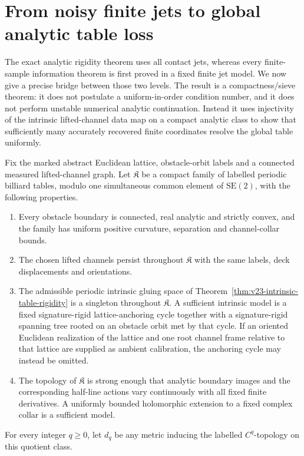 \section{From noisy finite jets to global analytic table loss}
\label{sec:v23-analytic-global-bridge}

The exact analytic rigidity theorem uses all contact jets, whereas every
finite-sample information theorem is first proved in a fixed finite jet model.
We now give a precise bridge between those two levels.  The result is a
compactness/sieve theorem: it does not postulate a uniform-in-order condition
number, and it does not perform unstable numerical analytic continuation.
Instead it uses injectivity of the intrinsic lifted-channel data map on a
compact analytic class to show that sufficiently many accurately recovered
finite coordinates resolve the global table uniformly.

Fix the marked abstract Euclidean lattice, obstacle-orbit labels and a
connected measured lifted-channel graph.  Let \(\mathfrak K\) be a compact
family of labelled periodic billiard tables, modulo one simultaneous common
element of \(\mathrm{SE}(2)\), with the following properties.
\begin{enumerate}
\item Every obstacle boundary is connected, real analytic and strictly convex,
and the family has uniform positive curvature, separation and channel-collar
bounds.
\item The chosen lifted channels persist throughout \(\mathfrak K\) with the
same labels, deck displacements and orientations.
\item The admissible periodic intrinsic gluing space of
Theorem~\ref{thm:v23-intrinsic-table-rigidity} is a singleton throughout
\(\mathfrak K\).  A sufficient intrinsic model is a fixed signature-rigid
lattice-anchoring cycle together with a signature-rigid spanning tree rooted
on an obstacle orbit met by that cycle.  If an oriented Euclidean realization
of the lattice and one root channel frame relative to that lattice are supplied
as ambient calibration, the anchoring cycle may instead be omitted.
\item The topology of \(\mathfrak K\) is strong enough that analytic boundary
images and the corresponding half-line actions vary continuously with all
fixed finite derivatives.  A uniformly bounded holomorphic extension to a
fixed complex collar is a sufficient model.
\end{enumerate}
For every integer \(q\ge0\), let \(d_q\) be any metric inducing the labelled
\(C^q\)-topology on this quotient class.

